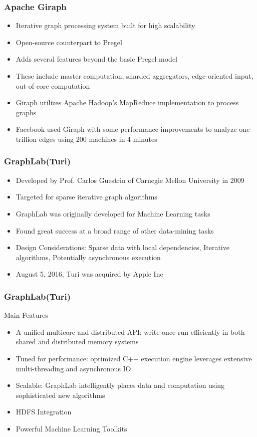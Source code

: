 \documentclass{beamer}
\begin{document}
\begin{frame}
  \frametitle{Apache Giraph}
	\begin{itemize}
	\item{Iterative graph processing system built for high scalability}
	\item{Open-source counterpart to Pregel}
	\item{Adds several features beyond the basic Pregel model}
	\item{These include master computation, sharded aggregators, edge-oriented input, out-of-core computation}
	\item{Giraph utilizes Apache Hadoop's MapReduce implementation to process graphs}
	\item{ Facebook used Giraph with some performance improvements to analyze one trillion edges using 200 machines in 4 minutes}
	\end{itemize}
\end{frame}
\begin{frame}
  \frametitle{GraphLab(Turi)}
	\begin{itemize}
	\item{Developed by Prof. Carlos Guestrin of Carnegie Mellon University in 2009}
	\item{Targeted for sparse iterative graph algorithms}
	\item{GraphLab was originally developed for Machine Learning tasks}
	\item{Found great success at a broad range of other data-mining tasks}
	\item{Design Considerations: Sparse data with local dependencies, Iterative algorithms, Potentially asynchronous execution}
	\item{August 5, 2016, Turi was acquired by Apple Inc}	
	\end{itemize}
\end{frame}
\begin{frame}
  \frametitle{GraphLab(Turi)}
  Main Features
	\begin{itemize}
	\item{A unified multicore and distributed API: write once run efficiently in both shared and distributed memory systems}
	\item{Tuned for performance: optimized C++ execution engine leverages extensive multi-threading and asynchronous IO}
	\item{Scalable: GraphLab intelligently places data and computation using sophisticated new algorithms}
	\item{HDFS Integration}
	\item{Powerful Machine Learning Toolkits}	
	\end{itemize}
\end{frame}
\end{document}
